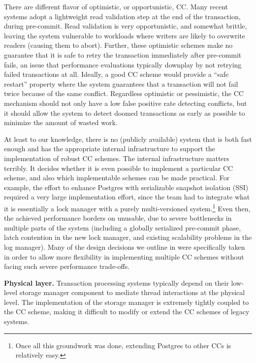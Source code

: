 There are different flavor of optimistic, or opportunistic, CC. Many recent systems adopt a lightweight read validation step at the end of the transaction, during pre-commit. Read validation is very opportunistic, and somewhat brittle, leaving the system vulnerable to workloads where writers are likely to overwrite readers (causing them to abort).
Further, these optimistic schemes make no guarantee that it is safe to retry the transaction immediately after pre-commit fails, an issue that performance evaluations typically downplay by not retrying failed transactions at all. Ideally, a good CC scheme would provide a ``safe restart'' property \cite{PortsG12} where the system guarantees that a transaction will not fail twice because of the same conflict.
Regardless optimistic or pessimistic, the CC mechanism should not only have a low false positive rate detecting conflicts, but it should allow the system to detect doomed transactions as early as possible to minimize the amount of wasted work.

At least to our knowledge, there is no (publicly available) system that is both fast enough and has the appropriate internal infrastructure to support the implementation of robust CC schemes. The internal infrastructure matters terribly. It decides whether it is even possible to implement a particular CC scheme, and also which implementable schemes can be made practical. For example, the effort to enhance Postgres with serializable snapshot isolation (SSI) required a very large implementation effort, since the team had to integrate what it is essentially a lock manager with a purely multi-versioned system.\footnote{Once all this groundwork was done, extending Postgres to other CCs is relatively easy.} Even then, the achieved performance borders on unusable, due to severe bottlenecks in multiple parts of the system (including a globally serialized pre-commit phase, latch contention in the new lock manager, and existing scalability problems in the log manager).  Many of the design decisions we outline in  were specifically taken in order to allow more flexibility in implementing multiple CC schemes without facing such severe performance trade-offs.

\vspace{2mm}
{\bf Physical layer.} 
Transaction processing systems typically depend on their low-level storage manager component to mediate thread interactions at the physical level.
The implementation of the storage manager is extremely tightly coupled to the CC scheme, making it difficult to modify or extend the CC schemes of legacy systems.  

